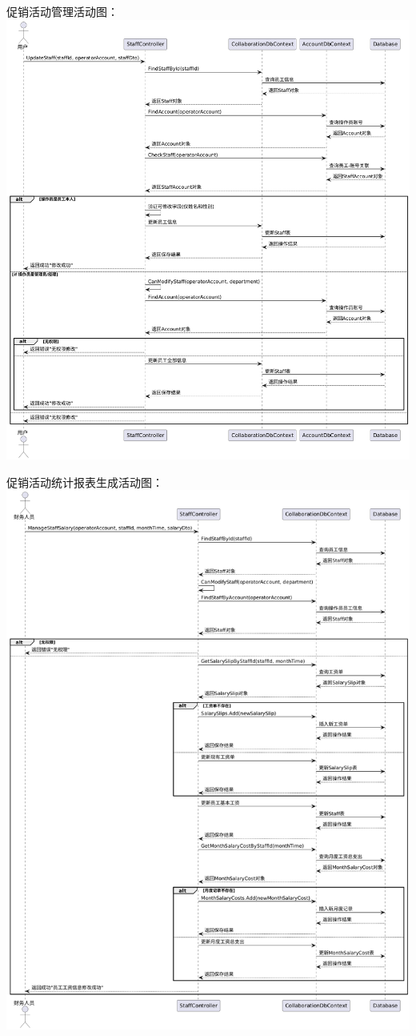 \documentclass[]{article}
\begin{document}
促销活动管理活动图：
\includegraphics{media/media/image17.png}

促销活动统计报表生成活动图：
\includegraphics{media/media/image18.png}
\end{document}
